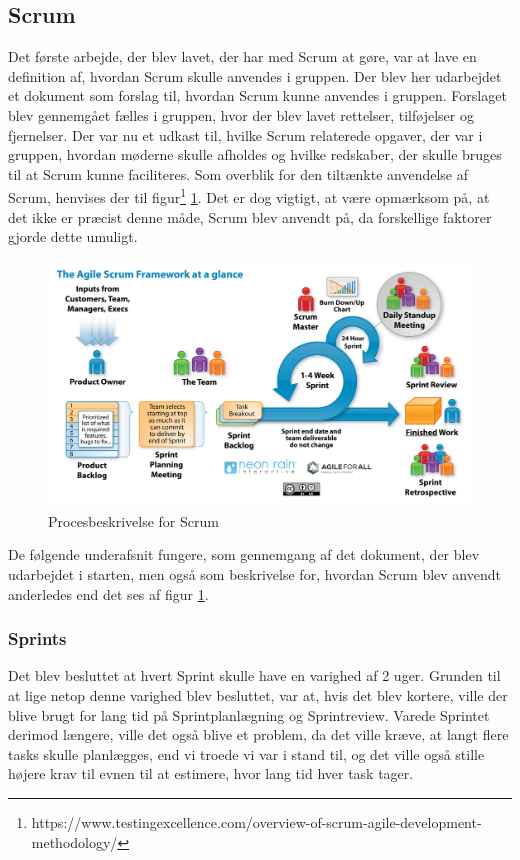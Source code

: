 \documentclass[a4paper,12pt,fleqn,oneside]{article}
\begin{document}
\subsection{Scrum}
Det første arbejde, der blev lavet, der har med Scrum at gøre, var at lave en definition af, hvordan Scrum skulle anvendes i gruppen. Der blev her udarbejdet et dokument som forslag til, hvordan Scrum kunne anvendes i gruppen. Forslaget blev gennemgået fælles i gruppen, hvor der blev lavet rettelser, tilføjelser og fjernelser. Der var nu et udkast til, hvilke Scrum relaterede opgaver, der var i gruppen, hvordan møderne skulle afholdes og hvilke redskaber, der skulle bruges til at Scrum kunne faciliteres. Som overblik for den tiltænkte anvendelse af Scrum, henvises der til figur\footnote{https://www.testingexcellence.com/overview-of-scrum-agile-development-methodology/} \ref{fig:scrum_process}. Det er dog vigtigt, at være opmærksom på, at det ikke er præcist denne måde, Scrum blev anvendt på, da forskellige faktorer gjorde dette umuligt. 
\begin{figure}[H]
    \centering
    \includegraphics[width=\textwidth]{Processdokument/graphics/scrum_process_afa_5000.jpg}
    \caption{Procesbeskrivelse for Scrum}
    \label{fig:scrum_process}
\end{figure}
De følgende underafsnit fungere, som gennemgang af det dokument, der blev udarbejdet i starten, men også som beskrivelse for, hvordan Scrum blev anvendt anderledes end det ses af figur \ref{fig:scrum_process}.
\subsubsection{Sprints}
Det blev besluttet at hvert Sprint skulle have en varighed af 2 uger. Grunden til at lige netop denne varighed blev besluttet, var at, hvis det blev kortere, ville der blive brugt for lang tid på Sprintplanlægning og Sprintreview. Varede Sprintet derimod længere, ville det også blive et problem, da det ville kræve, at langt flere tasks skulle planlægges,  end vi troede vi var i stand til, og det ville også stille højere krav til evnen til at estimere, hvor lang tid hver task tager.  
\end{document}
